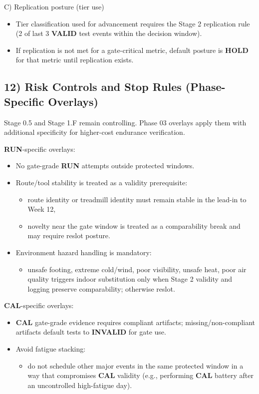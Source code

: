 \documentclass[10pt]{article}
\begin{document}
C) Replication posture (tier use)

\begin{itemize}
\item Tier classification used for advancement requires the Stage 2 replication rule (2 of last 3 \textbf{VALID} test events within the decision window).
\item If replication is not met for a gate-critical metric, default posture is \textbf{HOLD} for that metric until replication exists.
\end{itemize}

\subsection*{12) Risk Controls and Stop Rules (Phase-Specific Overlays)}

Stage 0.5 and Stage 1.F remain controlling. Phase 03 overlays apply them with additional specificity for higher-cost endurance verification.

\textbf{RUN}-specific overlays:

\begin{itemize}
\item No gate-grade \textbf{RUN} attempts outside protected windows.
\item Route/tool stability is treated as a validity prerequisite:
  \begin{itemize}
  \item route identity or treadmill identity must remain stable in the lead-in to Week 12,
  \item novelty near the gate window is treated as a comparability break and may require reslot posture.
  \end{itemize}
\item Environment hazard handling is mandatory:
  \begin{itemize}
  \item unsafe footing, extreme cold/wind, poor visibility, unsafe heat, poor air quality triggers indoor substitution only when Stage 2 validity and logging preserve comparability; otherwise reslot.
  \end{itemize}
\end{itemize}

\textbf{CAL}-specific overlays:

\begin{itemize}
\item \textbf{CAL} gate-grade evidence requires compliant artifacts; missing/non-compliant artifacts default tests to \textbf{INVALID} for gate use.
\item Avoid fatigue stacking:
  \begin{itemize}
  \item do not schedule other major events in the same protected window in a way that compromises \textbf{CAL} validity (e.g., performing \textbf{CAL} battery after an uncontrolled high-fatigue day).
  \end{itemize}
\end{itemize}
\end{document}
